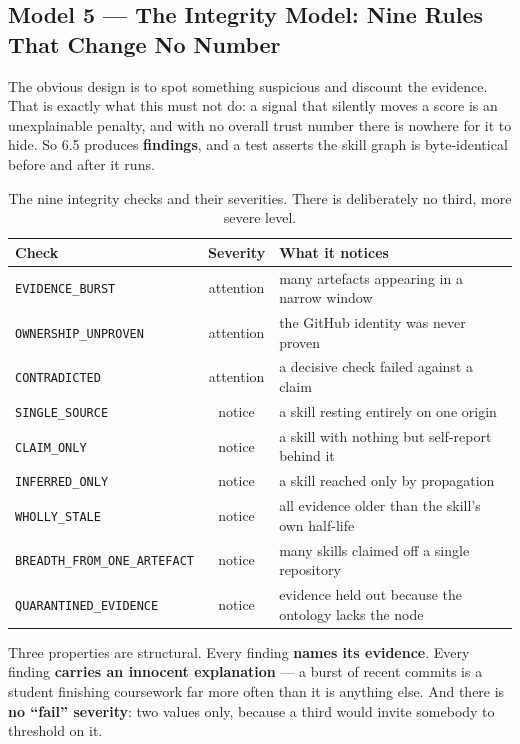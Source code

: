 \documentclass[11pt,a4paper]{article}
\begin{document}
\subsection*{Model 5 --- The Integrity Model: Nine Rules That Change No Number}

The obvious design is to spot something suspicious and discount the
evidence. That is exactly what this must not do: a signal that silently
moves a score is an unexplainable penalty, and with no overall trust number
there is nowhere for it to hide. So 6.5 produces \textbf{findings}, and a
test asserts the skill graph is byte-identical before and after it runs.

\begin{table}[H]
\centering\small
\begin{tabular}{@{}lcL{6.8cm}@{}}
\toprule
\textbf{Check} & \textbf{Severity} & \textbf{What it notices} \\
\midrule
\texttt{EVIDENCE\_BURST}            & attention & many artefacts appearing in a narrow window \\
\texttt{OWNERSHIP\_UNPROVEN}        & attention & the GitHub identity was never proven \\
\texttt{CONTRADICTED}               & attention & a decisive check failed against a claim \\
\texttt{SINGLE\_SOURCE}             & notice    & a skill resting entirely on one origin \\
\texttt{CLAIM\_ONLY}                & notice    & a skill with nothing but self-report behind it \\
\texttt{INFERRED\_ONLY}             & notice    & a skill reached only by propagation \\
\texttt{WHOLLY\_STALE}              & notice    & all evidence older than the skill's own half-life \\
\texttt{BREADTH\_FROM\_ONE\_ARTEFACT} & notice  & many skills claimed off a single repository \\
\texttt{QUARANTINED\_EVIDENCE}      & notice    & evidence held out because the ontology lacks the node \\
\bottomrule
\end{tabular}
\caption{The nine integrity checks and their severities. There is
deliberately no third, more severe level.}
\end{table}

Three properties are structural. Every finding \textbf{names its
evidence}. Every finding \textbf{carries an innocent explanation} --- a
burst of recent commits is a student finishing coursework far more often
than it is anything else. And there is \textbf{no ``fail'' severity}: two
values only, because a third would invite somebody to threshold on it.
\end{document}
